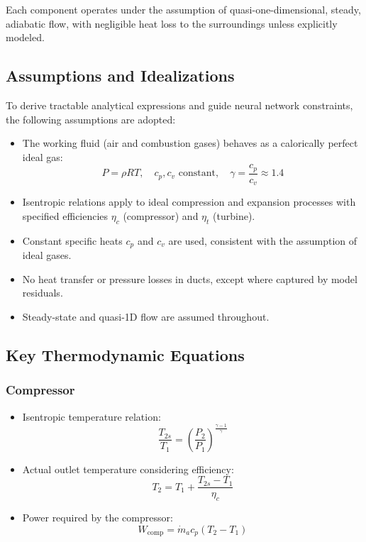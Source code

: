 \documentclass[
  12pt,
  oneside,
  a4paper,
  english,
  brazil]{abntex2}
\begin{document}
Each component operates under the assumption of quasi-one-dimensional,
steady, adiabatic flow, with negligible heat loss to the surroundings
unless explicitly modeled.

\subsection{Assumptions and
Idealizations}\label{assumptions-and-idealizations}

To derive tractable analytical expressions and guide neural network
constraints, the following assumptions are adopted:

\begin{itemize}
    \item The working fluid (air and combustion gases) behaves as a calorically perfect ideal gas:
$$
    P = \rho R T, \quad c_p, c_v \text{ constant}, \quad \gamma = \frac{c_p}{c_v} \approx 1.4
$$

    \item Isentropic relations apply to ideal compression and expansion processes with specified efficiencies $\eta_c$ (compressor) and $\eta_t$ (turbine).
    \item Constant specific heats $c_p$ and $c_v$ are used, consistent with the assumption of ideal gases.
    \item No heat transfer or pressure losses in ducts, except where captured by model residuals.
    \item Steady-state and quasi-1D flow are assumed throughout.
\end{itemize}

\subsection{Key Thermodynamic
Equations}\label{key-thermodynamic-equations}

\subsubsection{Compressor}\label{compressor}

\begin{itemize}
    \item Isentropic temperature relation:
$$
    \frac{T_{2s}}{T_1} = \left( \frac{P_2}{P_1} \right)^{\frac{\gamma - 1}{\gamma}}
$$

    \item Actual outlet temperature considering efficiency:
$$
    T_2 = T_1 + \frac{T_{2s} - T_1}{\eta_c}
$$

    \item Power required by the compressor:
$$
    W_{\text{comp}} = \dot{m}_a c_p (T_2 - T_1)
$$

\end{itemize}
\end{document}
